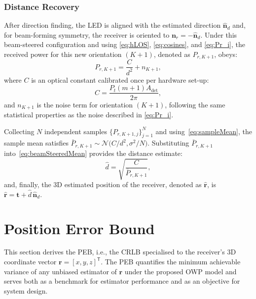 \documentclass[journal]{IEEEtran}
\begin{document}
\subsubsection{Distance Recovery}

After direction finding, the LED is aligned with the estimated direction
\(\hat{\mathbf{n}}_{d}\) and, for beam-forming symmetry, the receiver is oriented to
\(\mathbf{n}_{r}=-\hat{\mathbf{n}}_{d}\).  
Under this beam-steered configuration and using \eqref{eq:hLOS}, \eqref{eq:cosines}, and \eqref{eq:Pr_i},
the received power for this new orientation \((K+1)\), denoted as \(P_{r,K+1}\), obeys:
\begin{equation}
P_{r,K+1}= \frac{C}{d^{2}}+n_{K+1},
\label{eq:beamSteeredMean}
\end{equation}
where \(C\) is an optical constant calibrated once per hardware set-up:
\begin{equation}
C = \frac{P_{t}(m+1)A_{\text{det}}}{2\pi},
\label{eq:constant_C}
\end{equation} 
and \(n_{K+1}\) is the noise term for orientation \((K+1)\), following the same statistical properties as the noise described in \eqref{eq:Pr_i}.

Collecting \(N\) independent samples \(\{P_{r,K+1,j}\}_{j=1}^{N}\) and
using~\eqref{eq:sampleMean}, the sample mean satisfies
\(\bar P_{r,K+1}\sim\mathcal{N}\bigl(C/d^{2},\sigma^{2}/N\bigr)\).
Substituting \(\bar P_{r,K+1}\) into~\eqref{eq:beamSteeredMean} provides the distance estimate:
\begin{equation}
\hat d = \sqrt{\frac{C}{\bar P_{r,K+1}}},
\label{eq:dhat}
\end{equation}
and, finally, the 3D estimated position of the receiver, denoted as \(\hat{\mathbf{r}}\), is
$\hat{\mathbf{r}} = \mathbf{t} + \hat d \,\hat{\mathbf{n}}_{d}$.


\section{Position Error Bound}
\label{sec:PEB}

This section derives the PEB, i.e., the CRLB specialised to the receiver’s 3D coordinate vector
\(\mathbf{r}=[x,y,z]^{\mathsf T}\).  The PEB quantifies the minimum achievable variance of
any unbiased estimator of \(\mathbf{r}\) under the proposed OWP model and serves both
as a benchmark for estimator performance and as an objective for system design.
\end{document}
